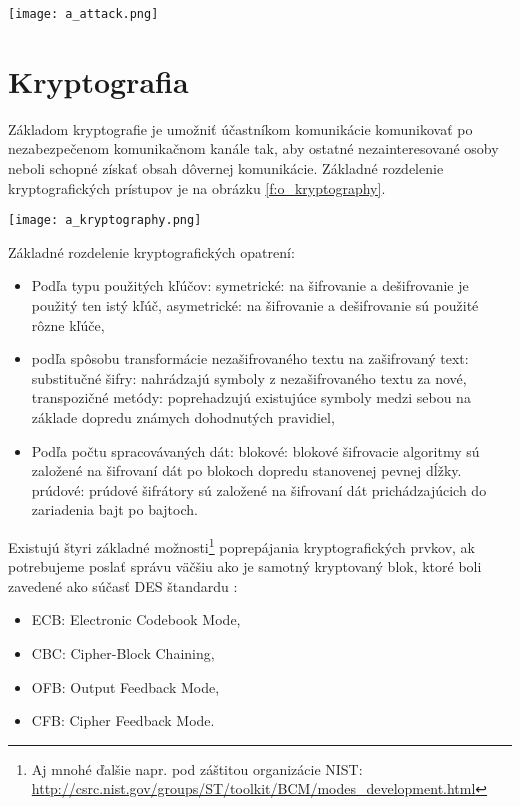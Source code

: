 \documentclass[12pt,a4paper,oneside,openright]{report}
\begin{document}
\begin{figure*}[h]
	\centering
	\texttt{[image: a\_attack.png]}
	\caption{Všeobecný priebeh útoku.
	\cite{bidgoli2006handbook}}
	\label{f:o_attack}
\end{figure*}

\section{Kryptografia} \label{s_cryptography}
Základom kryptografie je umožniť účastníkom komunikácie komunikovať po nezabezpečenom komunikačnom kanále tak, aby ostatné nezainteresované osoby neboli schopné získať obsah dôvernej komunikácie\cite{cryptodef}. Základné rozdelenie kryptografických prístupov je na obrázku \ref{f:o_kryptography}.

\begin{figure*}[!htb]
	\centering
	\texttt{[image: a\_kryptography.png]}
	\caption{Rozdelenie kryptografických prístupov\cite{bidgoli2006handbook}.}
	\label{f:o_kryptography}
\end{figure*}

Základné rozdelenie kryptografických opatrení:
\singlespacing
\begin{itemize}
	\item Podľa typu použitých kľúčov:
		\subitem symetrické: na šifrovanie a dešifrovanie je použitý ten istý kľúč,
		\subitem asymetrické: na šifrovanie a dešifrovanie sú použité rôzne kľúče,
	\item podľa spôsobu transformácie nezašifrovaného textu na zašifrovaný text:
		\subitem substitučné šifry: nahrádzajú symboly z nezašifrovaného textu za nové,
		\subitem transpozičné metódy: poprehadzujú existujúce symboly medzi sebou na základe dopredu známych dohodnutých pravidiel,
	\item Podľa počtu spracovávaných dát:
		\subitem blokové: blokové šifrovacie algoritmy sú založené na šifrovaní dát po blokoch dopredu stanovenej pevnej dĺžky.
		\subitem prúdové: prúdové šifrátory sú založené na šifrovaní dát prichádzajúcich do zariadenia bajt po bajtoch.
\end{itemize}
\onehalfspacing


Existujú štyri základné možnosti\footnote{Aj mnohé ďalšie napr. pod záštitou organizácie NIST: \url{http://csrc.nist.gov/groups/ST/toolkit/BCM/modes_development.html}} poprepájania kryptografických prvkov, ak potrebujeme poslať správu väčšiu ako je samotný kryptovaný blok, ktoré boli zavedené ako súčasť DES štandardu \cite{bidgoli2006handbook}:
\singlespacing
\begin{itemize}
	\item ECB: Electronic Codebook Mode,
	\item CBC: Cipher-Block Chaining,
	\item OFB: Output Feedback Mode,
	\item CFB: Cipher Feedback Mode.
\end{itemize}
\onehalfspacing
\end{document}
